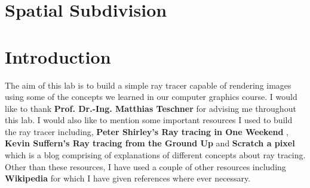 \documentclass[11pt,a4paper]{article}
\begin{document}
	\section{Spatial Subdivision}
	\section{Introduction}
	The aim of this lab is to build a simple ray tracer capable of rendering images using some of the concepts we learned in our computer graphics course. I would like to thank \textbf{Prof. Dr.-Ing. Matthias Teschner} for advising me throughout this lab. I would also like to mention some important resources I used to build the ray tracer including, \textbf{Peter Shirley's Ray tracing in One Weekend} \cite{Shirley2020RTW1}, \textbf{Kevin Suffern's Ray tracing from the Ground Up} \cite{suffern2016ray} and \textbf{Scratch a pixel} \cite{scratchapixel} which is a blog comprising of explanations of different concepts about ray tracing. Other than these resources, I have used a couple of other resources including \textbf{Wikipedia} for which I have given references where ever necessary.
	
\end{document}
